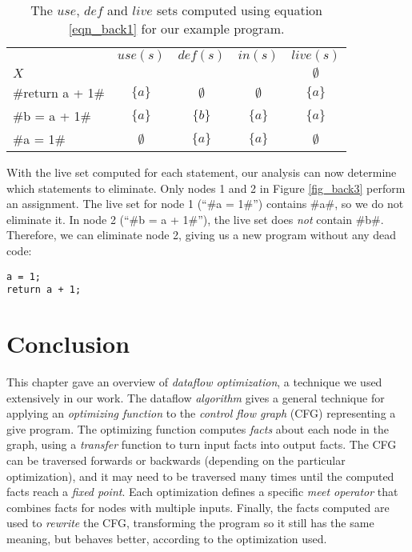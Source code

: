 \documentclass[12pt]{report}
\begin{document}
\begin{table}  
  \centering
  \begin{tabular}{lcccc}

    & $use(s)$ & $def(s)$ & $in(s)$ &  $live(s)$ \\
    \cmidrule(r){2-2}\cmidrule(r){3-3}\cmidrule(r){4-4}\cmidrule(r){5-5}
    $X$ & & & & $\emptyset$ \\
    #return a + 1# & $\{a\}$ & $\emptyset$ & $\emptyset$ & $\{a\}$ \\
    #b = a + 1# & $\{a\}$ & $\{b\}$ & $\{a\}$ & $\{a\}$ \\
    #a = 1# & $\emptyset$ & $\{a\}$ & $\{a\}$ & $\emptyset$ \\
    \bottomrule
  \end{tabular}
  \caption{The $use$, $def$ and $live$ sets computed using equation \ref{eqn_back1} for our example program.}
  \label{tbl_back1}
\end{table}

With the live set computed for each statement, our analysis can now
determine which statements to eliminate. Only nodes 1 and 2 in Figure
\ref{fig_back3} perform an assignment. The live set for node 1 (``#a = 1#'') 
contains #a#, so we do not eliminate it. In node 2 (``#b = a + 1#''), 
the live set does \emph{not} contain #b#. Therefore, we can eliminate
node 2, giving us a new program without any dead code:

\begin{Verbatim}
a = 1; 
return a + 1;
\end{Verbatim}

\section{Conclusion}

This chapter gave an overview of \emph{dataflow optimization}, a
technique we used extensively in our work. The dataflow
\emph{algorithm} gives a general technique for applying an
\emph{optimizing function} to the \emph{control flow graph} (CFG)
representing a give program. The optimizing function computes
\emph{facts} about each node in the graph, using a \emph{transfer}
function to turn input facts into output facts. The CFG can be
traversed forwards or backwards (depending on the particular
optimization), and it may need to be traversed many times until the
computed facts reach a \emph{fixed point}.  Each optimization defines
a specific \emph{meet operator} that combines facts for nodes with
multiple inputs. Finally, the facts computed are used to
\emph{rewrite} the CFG, transforming the program so it still has the
same meaning, but behaves better, according to the optimization used.
\end{document}
